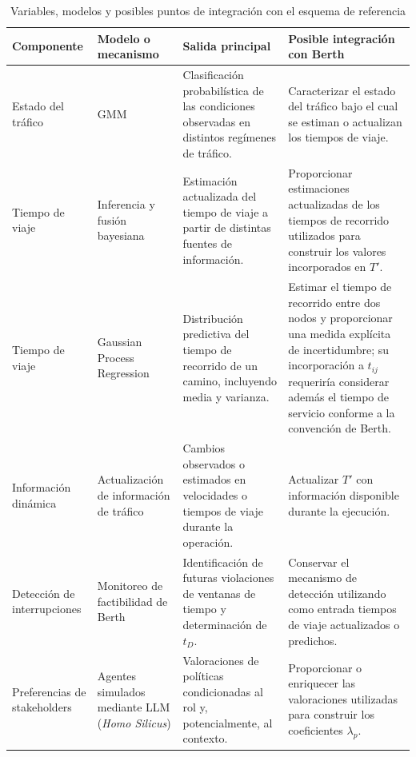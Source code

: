 \documentclass[11pt]{article}
\begin{document}
\begin{table}[ht]
\centering
\small
\caption{Variables, modelos y posibles puntos de integración con el esquema de referencia}
\label{tab:modelos_variables}

\renewcommand{\arraystretch}{1.15}

\begin{tabularx}{\textwidth}{
@{}
>{\raggedright\arraybackslash}p{}
>{\raggedright\arraybackslash}p{}
>{\raggedright\arraybackslash}p{}
>{\raggedright\arraybackslash}X
@{}}
\toprule
\textbf{Componente} &
\textbf{Modelo o mecanismo} &
\textbf{Salida principal} &
\textbf{Posible integración con Berth} \\
\midrule

Estado del tráfico &
GMM &
Clasificación probabilística de las condiciones observadas en distintos regímenes de tráfico. &
Caracterizar el estado del tráfico bajo el cual se estiman o actualizan los tiempos de viaje. \\[0.25em]

Tiempo de viaje &
Inferencia y fusión bayesiana &
Estimación actualizada del tiempo de viaje a partir de distintas fuentes de información. &
Proporcionar estimaciones actualizadas de los tiempos de recorrido utilizados para construir los valores incorporados en \(T'\). \\[0.25em]

Tiempo de viaje &
Gaussian Process Regression &
Distribución predictiva del tiempo de recorrido de un camino, incluyendo media y varianza. &
Estimar el tiempo de recorrido entre dos nodos y proporcionar una medida explícita de incertidumbre; su incorporación a \(t_{ij}\) requeriría considerar además el tiempo de servicio conforme a la convención de Berth. \\[0.25em]

Información dinámica &
Actualización de información de tráfico &
Cambios observados o estimados en velocidades o tiempos de viaje durante la operación. &
Actualizar \(T'\) con información disponible durante la ejecución. \\[0.25em]

Detección de interrupciones &
Monitoreo de factibilidad de Berth &
Identificación de futuras violaciones de ventanas de tiempo y determinación de \(t_D\). &
Conservar el mecanismo de detección utilizando como entrada tiempos de viaje actualizados o predichos. \\[0.25em]

Preferencias de stakeholders &
Agentes simulados mediante LLM (\textit{Homo Silicus}) &
Valoraciones de políticas condicionadas al rol y, potencialmente, al contexto. &
Proporcionar o enriquecer las valoraciones utilizadas para construir los coeficientes \(\lambda_p\). \\

\bottomrule
\end{tabularx}
\end{table}
\end{document}
